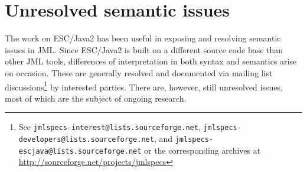 \documentclass{llncs}
\begin{document}
\section{Unresolved semantic issues}

The work on ESC/Java2 has been useful in exposing and resolving
semantic issues in JML.  Since ESC/Java2 is built on a different
source code base than other JML tools, differences of interpretation
in both syntax and semantics arise on occasion.  These are generally
resolved and documented via mailing list discussions\footnote{See
  \texttt{jmlspecs-interest@lists.sourceforge.net},
  \texttt{jmlspecs-developers@lists.sourceforge.net}, and
  \texttt{jmlspecs-escjava@lists.sourceforge.net} or the corresponding
  archives at \url{http://sourceforge.net/projects/jmlspecs}} by
interested parties.  There are, however, still unresolved issues, most
of which are the subject of ongoing research.
\setlength{\partopsep}{0in}\setlength{\parskip}{0in}\setlength{\itemsep}{0in}\setlength{\topsep}{0in}
\end{document}
